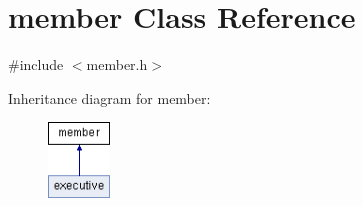 \hypertarget{classmember}{}\section{member Class Reference}
\label{classmember}


{\ttfamily \#include $<$member.\+h$>$}

Inheritance diagram for member\+:\begin{figure}[H]
\begin{center}
\leavevmode
\includegraphics[height=2.000000cm]{classmember}
\end{center}
\end{figure}
